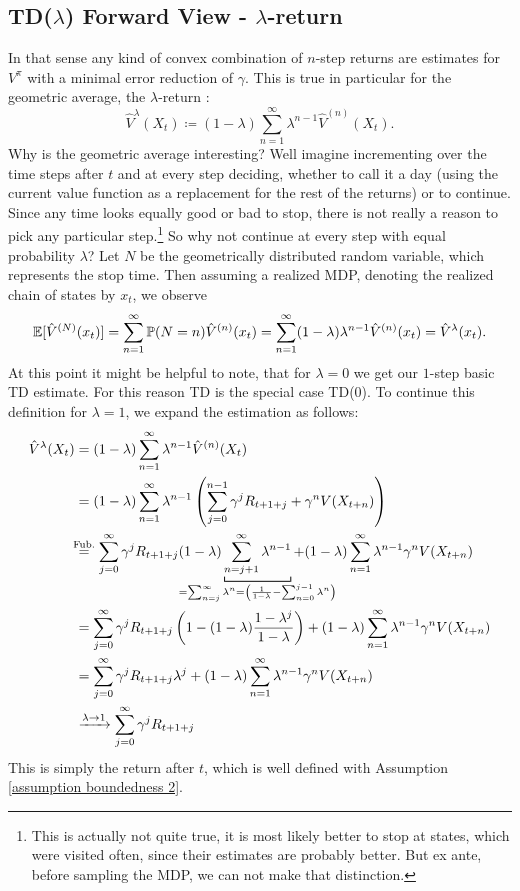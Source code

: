 \subsection{TD(\(\lambda\)) Forward View - \(\lambda\)-return}
In that sense any kind of convex combination of \(n\)-step returns are estimates for \(V^\pi\) with a minimal error reduction of \(\gamma\). This is true in particular for the geometric average, the \(\lambda\)-return \parencite{watkinsLearningDelayedRewards1989}:
\[
	\hat{V}^\lambda(X_t)\coloneqq (1-\lambda)\sum_{n=1}^\infty \lambda^{n-1} \hat{V}^{(n)}(X_t).
\]
Why is the geometric average interesting? Well imagine incrementing over the time steps after \(t\) and at every step deciding, whether to call it a day (using the current value function as a replacement for the rest of the returns) or to continue. Since any time looks equally good or bad to stop, there is not really a reason to pick any particular step.\footnote{This is actually not quite true, it is most likely better to stop at states, which were visited often, since their estimates are probably better. But ex ante, before sampling the MDP, we can not make that distinction.} So why not continue at every step with equal probability \(\lambda\)? Let \(N\) be the geometrically distributed random variable, which represents the stop time. Then assuming a realized MDP, denoting the realized chain of states by \(x_t\), we observe
\[
	\mathbb{E}[\hat{V}^{(N)}(x_t)]=\sum_{n=1}^\infty \mathbb{P}(N=n) \hat{V}^{(n)}(x_t) 
	=\sum_{n=1}^\infty (1-\lambda)\lambda^{n-1} \hat{V}^{(n)}(x_t)=\hat{V}^\lambda (x_t).
\]
At this point it might be helpful to note, that for \(\lambda=0\) we get our \(1\)-step basic TD estimate. For this reason TD is the special case TD(\(0\)). To continue this definition for \(\lambda=1\), we expand the estimation as follows:
\begin{align}
	\hat{V}^\lambda(X_t)&=(1-\lambda)\sum_{n=1}^\infty \lambda^{n-1} \hat{V}^{(n)}(X_t)
	\nonumber\\
	&=(1-\lambda)\sum_{n=1}^\infty \lambda^{n-1}
	\left(
		\sum_{j=0}^{n-1}\gamma^j R_{t+1+j} + \gamma^n V(X_{t+n})
	\right)
	\nonumber\\
	&\lxeq{\text{Fub.}}\sum_{j=0}^\infty \gamma^j R_{t+1+j} 
	(1-\lambda)\underbracket[0.7pt]{\sum_{n=j+1}^\infty \lambda^{n-1}}_{
		\mathclap{=\sum_{n=j}^\infty \lambda^n = \left(\frac{1}{1-\lambda} - \sum_{n=0}^{j-1}\lambda^n\right)}
	}
	+ (1-\lambda) \sum_{n=1}^\infty \lambda^{n-1}\gamma^n V(X_{t+n})
	\nonumber\\
	&=\sum_{j=0}^\infty \gamma^j R_{t+1+j} 
	\left(1- (1-\lambda)\frac{1-\lambda^j}{1-\lambda} \right) 
	+ (1-\lambda)\sum_{n=1}^\infty \lambda^{n-1}\gamma^n V(X_{t+n})
	\nonumber\\
	&=\sum_{j=0}^\infty \gamma^j R_{t+1+j} \lambda^j 
	+ (1-\lambda)\sum_{n=1}^\infty \lambda^{n-1}\gamma^n V(X_{t+n})
	\label{tangent backward view}\\
	&\xrightarrow{\lambda \to 1} \sum_{j=0}^\infty \gamma^j R_{t+1+j}
	\nonumber
\end{align}
This is simply the return after \(t\), which is well defined with Assumption \ref{assumption boundedness 2}.

